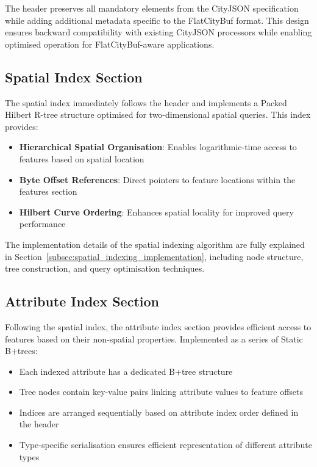 The header preserves all mandatory elements from the CityJSON specification while adding additional metadata specific to the FlatCityBuf format. This design ensures backward compatibility with existing CityJSON processors while enabling optimised operation for FlatCityBuf-aware applications.

\subsection{Spatial Index Section}
\label{subsec:spatial_index_section}

The spatial index immediately follows the header and implements a Packed Hilbert R-tree structure optimised for two-dimensional spatial queries. This index provides:

\begin{itemize}
  \item \textbf{Hierarchical Spatial Organisation}: Enables logarithmic-time access to features based on spatial location
  \item \textbf{Byte Offset References}: Direct pointers to feature locations within the features section
  \item \textbf{Hilbert Curve Ordering}: Enhances spatial locality for improved query performance
\end{itemize}

The implementation details of the spatial indexing algorithm are fully explained in Section~\ref{subsec:spatial_indexing_implementation}, including node structure, tree construction, and query optimisation techniques.

\subsection{Attribute Index Section}
\label{subsec:attribute_index_section}

Following the spatial index, the attribute index section provides efficient access to features based on their non-spatial properties. Implemented as a series of Static B+trees:

\begin{itemize}
  \item Each indexed attribute has a dedicated B+tree structure
  \item Tree nodes contain key-value pairs linking attribute values to feature offsets
  \item Indices are arranged sequentially based on attribute index order defined in the header
  \item Type-specific serialisation ensures efficient representation of different attribute types
\end{itemize}

